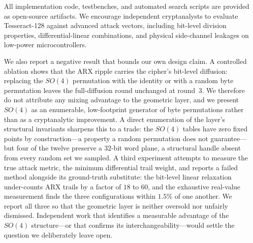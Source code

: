 \documentclass[review,12pt]{elsarticle}
\begin{document}
All implementation code, testbenches, and automated search scripts are provided as open-source artifacts. We encourage independent cryptanalysts to evaluate Tesseract-128 against advanced attack vectors, including bit-level division properties, differential-linear combinations, and physical side-channel leakages on low-power microcontrollers.

We also report a negative result that bounds our own design claim. A controlled ablation shows that the ARX ripple carries the cipher's bit-level diffusion: replacing the $SO(4)$ permutation with the identity or with a random byte permutation leaves the full-diffusion round unchanged at round~3. We therefore do not attribute any mixing advantage to the geometric layer, and we present $SO(4)$ as an enumerable, low-footprint generator of byte permutations rather than as a cryptanalytic improvement. A direct enumeration of the layer's structural invariants sharpens this to a trade: the $SO(4)$ tables have zero fixed points by construction---a property a random permutation does not guarantee---but four of the twelve preserve a $32$-bit word plane, a structural handle absent from every random set we sampled. A third experiment attempts to measure the true attack metric, the minimum differential trail weight, and reports a failed method alongside its ground-truth substitute: the bit-level linear relaxation under-counts ARX trails by a factor of $18$ to $60$, and the exhaustive real-value measurement finds the three configurations within $1.5\%$ of one another. We report all three so that the geometric layer is neither oversold nor unfairly dismissed. Independent work that identifies a measurable advantage of the $SO(4)$ structure---or that confirms its interchangeability---would settle the question we deliberately leave open.
\end{document}
